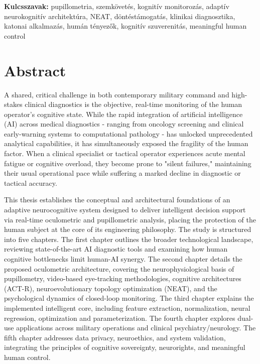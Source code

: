 \documentclass[12pt,a4paper,oneside]{book}
\begin{document}
\vspace{0.3cm}
\textbf{Kulcsszavak:} pupillometria, szemkövetés, kognitív monitorozás, adaptív neurokognitív architektúra, NEAT, döntéstámogatás, klinikai diagnosztika, katonai alkalmazás, humán tényezők, kognitív szuverenitás, meaningful human control

\vspace{1cm}

\chapter*{Abstract}

A shared, critical challenge in both contemporary military command and high-stakes clinical diagnostics is the objective, real-time monitoring of the human operator's cognitive state. While the rapid integration of artificial intelligence (AI) across medical diagnostics - ranging from oncology screening and clinical early-warning systems to computational pathology - has unlocked unprecedented analytical capabilities, it has simultaneously exposed the fragility of the human factor. When a clinical specialist or tactical operator experiences acute mental fatigue or cognitive overload, they become prone to "silent failures," maintaining their usual operational pace while suffering a marked decline in diagnostic or tactical accuracy.

This thesis establishes the conceptual and architectural foundations of an adaptive neurocognitive system designed to deliver intelligent decision support via real-time oculometric and pupillometric analysis, placing the protection of the human subject at the core of its engineering philosophy. The study is structured into five chapters. The first chapter outlines the broader technological landscape, reviewing state-of-the-art AI diagnostic tools and examining how human cognitive bottlenecks limit human-AI synergy. The second chapter details the proposed oculometric architecture, covering the neurophysiological basis of pupillometry, video-based eye-tracking methodologies, cognitive architectures (ACT-R), neuroevolutionary topology optimization (NEAT), and the psychological dynamics of closed-loop monitoring. The third chapter explains the implemented intelligent core, including feature extraction, normalization, neural regression, optimization and parameterization. The fourth chapter explores dual-use applications across military operations and clinical psychiatry/neurology. The fifth chapter addresses data privacy, neuroethics, and system validation, integrating the principles of cognitive sovereignty, neurorights, and meaningful human control.
\end{document}
